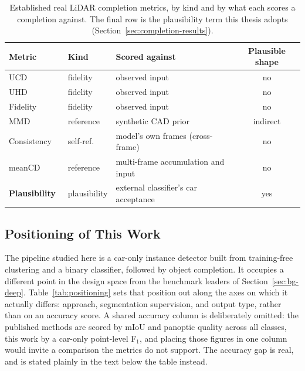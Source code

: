 \begin{table}[H]
  \centering
  \caption[Real LiDAR completion metrics by type]{Established real LiDAR completion
    metrics, by kind and by what each scores a completion against. The final row is the
    plausibility term this thesis adopts (Section~\ref{sec:completion-results}).}
  \label{tab:completion-metrics}
  \small
  \renewcommand{\arraystretch}{1.2}
  \setlength{\tabcolsep}{6pt}
  \begin{tabular}{@{}L{3.2cm}L{2.2cm}L{5.8cm}c@{}}
    \toprule
    Metric & Kind & Scored against & Plausible shape \\
    \midrule
    UCD~\cite{cui2023p2c}       & fidelity & observed input & no \\
    UHD~\cite{chen2020unpaired} & fidelity & observed input & no \\
    Fidelity~\cite{yuan2019pcnpointcompletionnetwork} & fidelity & observed input & no \\
    MMD~\cite{yuan2019pcnpointcompletionnetwork} & reference & synthetic CAD prior & indirect \\
    Consistency~\cite{yuan2019pcnpointcompletionnetwork} & self-ref. & model's own frames (cross-frame) & no \\
    meanCD~\cite{ren2022selfsupervised} & reference & multi-frame accumulation and input & no \\
    \midrule
    \textbf{Plausibility}~\cite{chen2020unpaired} & plausibility & external classifier's car acceptance & yes \\
    \bottomrule
  \end{tabular}
\end{table}

\subsection{Positioning of This Work}
\label{sec:bg-positioning}

The pipeline studied here is a car-only instance detector built from training-free
clustering and a binary classifier, followed by object completion. It occupies a
different point in the design space from the benchmark leaders of
Section~\ref{sec:bg-deep}. Table~\ref{tab:positioning} sets that position out along the
axes on which it actually differs: approach, segmentation supervision, and output type,
rather than on an accuracy score. A shared accuracy column is deliberately omitted:
the published methods are scored by mIoU and panoptic quality across all classes, this
work by a car-only point-level F$_1$, and placing those figures in one column would invite
a comparison the metrics do not support. The accuracy gap is real, and is stated plainly
in the text below the table instead.


